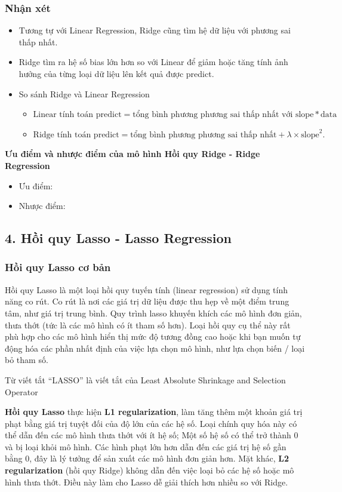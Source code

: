 \documentclass{article}
\begin{document}
	\subsubsection{Nhận xét}
	\begin{itemize}
		\item Tương tự với Linear Regression, Ridge cũng tìm hệ dữ liệu với phương sai thấp nhất.
		
		\item Ridge tìm ra hệ số bias lớn hơn so với Linear để giảm hoặc tăng tính ảnh hưởng của từng loại dữ liệu lên kết quả được predict.
		\item So sánh Ridge và Linear Regression
		\begin{itemize}
			\item $\text{Linear tính toán predict} = \text{tổng bình phương phương sai thấp nhất với slope} * \text{data}$
			\item $\text{Ridge tính toán predict} = \text{tổng bình phương phương sai thấp nhất} + \lambda \times \text{slope}^2.$
		\end{itemize}
	\end{itemize}
	\textbf{Ưu điểm và nhược điểm của mô hình Hồi quy Ridge - Ridge Regression}
	\begin{itemize}
		\item Ưu điểm:
		\item Nhược điểm:
	\end{itemize}
	\subsection{4. Hồi quy Lasso - Lasso Regression}
	\subsubsection{Hồi quy Lasso cơ bản}
	\qquad Hồi quy Lasso là một loại hồi quy tuyến tính (linear regression) sử dụng tính năng co rút. Co rút là nơi các giá trị dữ liệu được thu hẹp về một điểm trung tâm, như giá trị trung bình. Quy trình lasso khuyến khích các mô hình đơn giản, thưa thớt (tức là các mô hình có ít tham số hơn). Loại hồi quy cụ thể này rất phù hợp cho các mô hình hiển thị mức độ tương đồng cao hoặc khi bạn muốn tự động hóa các phần nhất định của việc lựa chọn mô hình, như lựa chọn biến / loại bỏ tham số.
	
	Từ viết tắt “LASSO” là viết tắt của Least Absolute Shrinkage and Selection Operator
	
	\textbf{Hồi quy Lasso} thực hiện  \textbf{L1 regularization}, làm tăng thêm một khoản giá trị phạt bằng giá trị tuyệt đối của độ lớn của các hệ số. Loại chính quy hóa này có thể dẫn đến các mô hình thưa thớt với ít hệ số; Một số hệ số có thể trở thành 0 và bị loại khỏi mô hình. Các hình phạt lớn hơn dẫn đến các giá trị hệ số gần bằng 0, đây là lý tưởng để sản xuất các mô hình đơn giản hơn. Mặt khác, \textbf{L2 regularization} (hồi quy Ridge) không dẫn đến việc loại bỏ các hệ số hoặc mô hình thưa thớt. Điều này làm cho Lasso dễ giải thích hơn nhiều so với Ridge.
	
\end{document}
